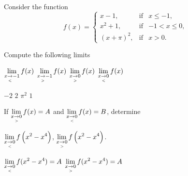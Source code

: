 \begin{Exercise}[difficulty = 1] Consider the function
\[
f(x)=\left\{\begin{array}{lcl}
x-1,  & \mbox{if} & x \leq -1, \\[0.1cm]
x^2+1,  & \mbox{if} & -1 < x \leq 0, \\[0.1cm]
(x + \pi)^2,  & \mbox{if} &  x > 0 .
\end{array}\right.
\]

Compute the following limits
\begin{multicols}{2}
	\Question  $\displaystyle\lim_{x\underset{<}{\rightarrow}-1} f(x)$ 
	\Question  $\displaystyle\lim_{x\underset{>}{\rightarrow}-1} f(x)$ 
	\Question  $\displaystyle\lim_{x\underset{>}{\rightarrow} 0} f(x)$ 
	\Question  $\displaystyle\lim_{x\underset{<}{\rightarrow} 0} f(x)$ 
\EndCurrentQuestion 
\end{multicols}

\end{Exercise}

\begin{Answer}\phantom{}
    \begin{multicols}{2}
		
		\Question  $-2$ 
		\Question  $2$ 
		\Question  $\pi^2$ 
		\Question  $1$ 
		\EndCurrentQuestion
	\end{multicols}
\end{Answer}



\ifanalysis
\begin{Exercise}[difficulty = 2] If $\displaystyle\lim_{x\underset{>}{\rightarrow}0} f(x) = A$ and $\displaystyle\lim_{x\underset{<}{\rightarrow}0} f(x)=B$, determine
\begin{multicols}{2}
    \Question $\displaystyle\lim_{x\underset{<}{\rightarrow}0} f\left(x^2-x^4\right)$,
    \Question $\displaystyle\lim_{x\underset{>}{\rightarrow}0} f\left(x^2-x^4\right)$.
    \EndCurrentQuestion
\end{multicols}

\end{Exercise}

\begin{Answer}\phantom{}
    \begin{multicols}{2}
    
        \Question $\displaystyle\lim_{x\underset{<}{\rightarrow}0} f(x^2-x^4)= A$  
        \Question $\displaystyle\lim_{x\underset{>}{\rightarrow}0} f(x^2-x^4)= A$
    \EndCurrentQuestion
    \end{multicols}
\end{Answer}
\fi

